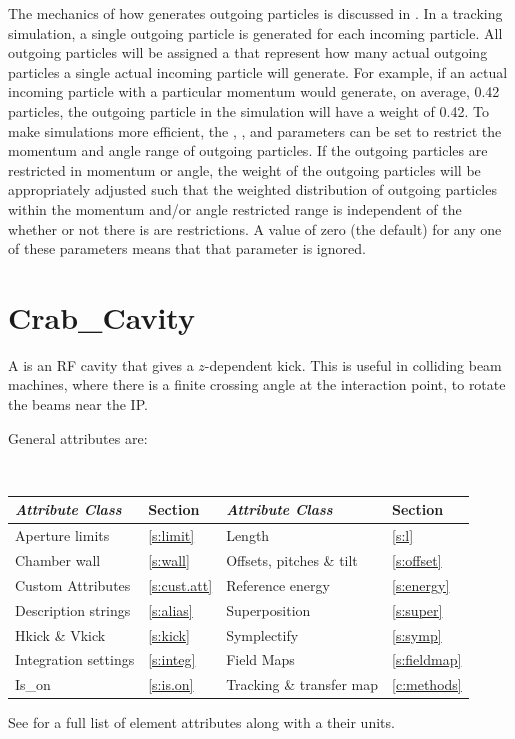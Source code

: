 The mechanics of how \bmad generates outgoing particles is discussed in .
In a tracking simulation, a single outgoing particle is generated for each incoming particle.  All
outgoing particles will be assigned a  that represent how many actual outgoing particles
a single actual incoming particle will generate. For example, if an actual incoming particle with a
particular momentum would generate, on average, 0.42 particles, the outgoing particle in the
simulation will have a weight of 0.42.  To make simulations more efficient, the ,
, and  parameters can be set to restrict the momentum and angle
range of outgoing particles. If the outgoing particles are restricted in momentum or angle, the
weight of the outgoing particles will be appropriately adjusted such that the weighted distribution
of outgoing particles within the momentum and/or angle restricted range is independent of the
whether or not there is are restrictions.  A value of zero (the default) for any one of these
parameters means that that parameter is ignored.

\newpage

\section{Crab_Cavity}
\label{s:crab}

A  is an RF cavity that gives a $z$-dependent kick. This is useful in colliding beam
machines, where there is a finite crossing angle at the interaction point, to rotate the beams near the IP.

General  attributes are:
\begin{center}
\tt
\begin{tabular}{llll} \toprule
  {\sl Attribute Class}      & Section           & {\sl Attribute Class}      & Section            \\ \midrule
  Aperture limits            & \ref{s:limit}     & Length                     & \ref{s:l}          \\
  Chamber wall               & \ref{s:wall}      & Offsets, pitches \& tilt   & \ref{s:offset}     \\
  Custom Attributes          & \ref{s:cust.att}  & Reference energy           & \ref{s:energy}     \\ 
  Description strings        & \ref{s:alias}     & Superposition              & \ref{s:super}      \\
  Hkick \& Vkick             & \ref{s:kick}      & Symplectify                & \ref{s:symp}       \\
  Integration settings       & \ref{s:integ}     & Field Maps                 & \ref{s:fieldmap}   \\
  Is_on                      & \ref{s:is.on}     & Tracking \& transfer map   & \ref{c:methods}    \\
  \bottomrule
\end{tabular}
\end{center}
\toffset
See  for a full list of element attributes along with a their units.

